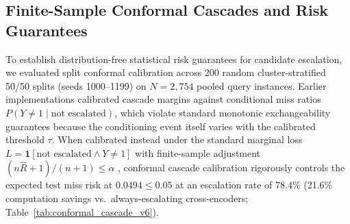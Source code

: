 \documentclass[conference]{IEEEtran}
\begin{document}
\begin{table}[htbp]
\centering
\small
\caption{Production Cross-Encoder Reranker Cascade Ablation (Held-Out Test Split, $N=306$ Probes, Clean Real-OCR).}
\label{tab:practical_stack}
\end{table}

\subsection{Finite-Sample Conformal Cascades and Risk Guarantees}
\label{sec:conformal_cascades}
\label{sec:conformal_eval}

To establish distribution-free statistical risk guarantees for candidate escalation, we evaluated split conformal calibration across 200 random cluster-stratified 50/50 splits (seeds 1000--1199) on $N=2{,}754$ pooled query instances. Earlier implementations calibrated cascade margins against conditional miss ratios $P(Y \ne 1 \mid \text{not escalated})$, which violate standard monotonic exchangeability guarantees because the conditioning event itself varies with the calibrated threshold $\tau$. When calibrated instead under the standard marginal loss $L = \mathbf{1}[\text{not escalated} \land Y \ne 1]$ with finite-sample adjustment $(n\hat{R}+1)/(n+1) \le \alpha$ \cite{bates2021conformal, angelopoulos2021gentle}, conformal cascade calibration rigorously controls the expected test miss risk at $0.0494 \le 0.05$ at an escalation rate of $78.4\%$ (21.6\% computation savings vs.\ always-escalating cross-encoders; Table~\ref{tab:conformal_cascade_v6}).
\end{document}
